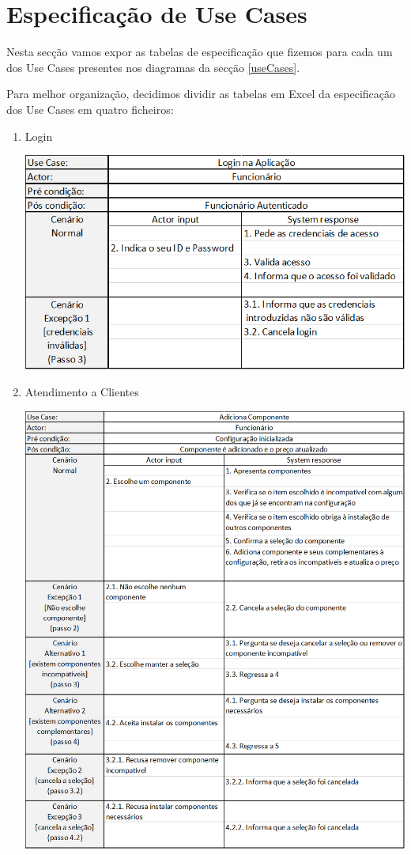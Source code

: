 \documentclass[11pt]{article} %
\begin{document}
\newpage
\section{Especificação de Use Cases}
Nesta secção vamos expor as tabelas de especificação que fizemos para cada um dos Use Cases presentes nos diagramas da secção \ref{useCases}.

Para melhor organização, decidimos dividir as tabelas em Excel da especificação dos Use Cases em quatro ficheiros: 
\begin{enumerate}
	\item Login

 		\includegraphics[width = 5in]{login.png} \newpage
	\item  Atendimento a Clientes
	\begin{center}
 		\includegraphics[width = 5in]{ac_adicionacomp.png} 

\end{center}
\end{enumerate}
\end{document}
